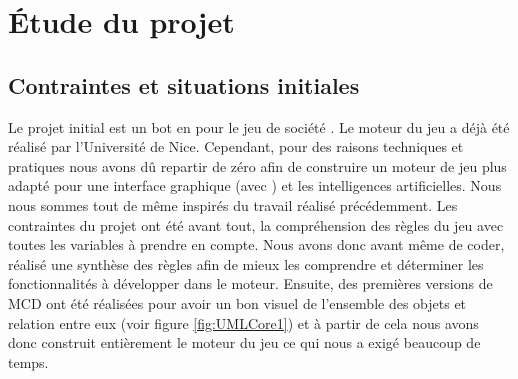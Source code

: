 \section{Étude du projet}
\subsection{Contraintes et situations initiales}
Le projet initial est un bot en \java pour le jeu de société \himalaya. Le moteur du jeu a déjà été réalisé par l'Université de Nice. Cependant, pour des raisons techniques et pratiques nous avons dû repartir de zéro afin de construire un moteur de jeu plus adapté pour une interface graphique (avec \fx) et les intelligences artificielles. Nous nous sommes tout de même inspirés du travail réalisé précédemment. 
Les contraintes du projet ont été avant tout, la compréhension des règles du jeu avec toutes les variables à prendre en compte. Nous avons donc avant même de coder, réalisé une synthèse des règles afin de mieux les comprendre et déterminer les fonctionnalités à développer dans le moteur. Ensuite, des premières versions de MCD ont été réalisées pour avoir un bon visuel de l'ensemble des objets et relation entre eux (voir figure \ref{fig:UMLCore1}) et à partir de cela nous avons donc construit entièrement le moteur du jeu ce qui nous a exigé beaucoup de temps.

